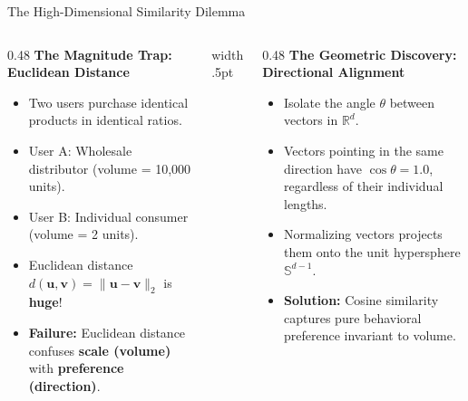 \documentclass[../m00-session-02.tex]{subfiles}
\begin{document}
\begin{frame}[fragile]{The High-Dimensional Similarity Dilemma}
  \begin{columns}[T,onlytextwidth]
    \begin{column}{0.48\textwidth}
      {\small\bfseries\color{UpGradRed}The Magnitude Trap: Euclidean Distance}\par\vspace{0.08cm}
      \begin{itemize}\setlength{\itemsep}{0.22em}\small
        \item Two users purchase identical products in identical ratios.
        \item User A: Wholesale distributor (volume = 10,000 units).
        \item User B: Individual consumer (volume = 2 units).
        \item Euclidean distance $d(\mathbf{u}, \mathbf{v}) = \|\mathbf{u} - \mathbf{v}\|_2$ is \textbf{huge}!
        \item \textcolor{UpGradRed}{\textbf{Failure:}} Euclidean distance confuses \textbf{scale (volume)} with \textbf{preference (direction)}.
      \end{itemize}
    \end{column}
    \hfill{\color{UpGradRule}\vrule width .5pt}\hfill
    \begin{column}{0.48\textwidth}
      {\small\bfseries\color{AWSEmerald}The Geometric Discovery: Directional Alignment}\par\vspace{0.08cm}
      \begin{itemize}\setlength{\itemsep}{0.22em}\small
        \item Isolate the angle $\theta$ between vectors in $\mathbb{R}^d$.
        \item Vectors pointing in the same direction have $\cos\theta = 1.0$, regardless of their individual lengths.
        \item Normalizing vectors projects them onto the unit hypersphere $\mathbb{S}^{d-1}$.
        \item \textcolor{AWSEmerald}{\textbf{Solution:}} Cosine similarity captures pure behavioral preference invariant to volume.
      \end{itemize}
      \vspace{0.08cm}
    \end{column}
  \end{columns}
\end{frame}
\end{document}
